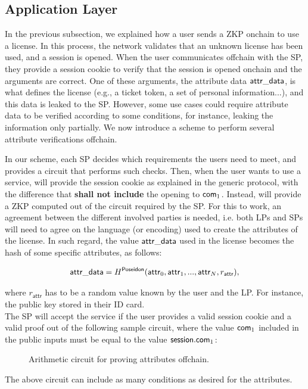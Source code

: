 \subsection{Application Layer}

In the previous subsection, we explained how a user sends a ZKP onchain to use a license. In this process, the network validates that an unknown license has been used, and a session is opened. When the user communicates offchain with the SP, they provide a session cookie to verify that the session is opened onchain and the arguments are correct. One of these arguments, the attribute data $\mathsf{attr\_data}$, is what defines the license (e.g., a ticket token, a set of personal information...), and this data is leaked to the SP. However, some use cases could require attribute data to be verified according to some conditions, for instance, leaking the information only partially. We now introduce a scheme to perform several attribute verifications offchain.

In our scheme, each SP decides which requirements the users need to meet, and provides a circuit that performs such checks. Then, when the user wants to use a service, will provide the session cookie as explained in the generic protocol, with the difference that \textbf{shall not include} the opening to $\mathsf{com}_1$. Instead, will provide a ZKP computed out of the circuit required by the SP. For this to work, an agreement between the different involved parties is needed, i.e. both LPs and SPs will need to agree on the language (or encoding) used to create the attributes of the license. In such regard, the value $\mathsf{attr\_data}$ used in the license becomes the hash of some specific attributes, as follows:

$$\mathsf{attr\_data} = H^\mathsf{Poseidon}(\mathsf{attr}_0, \mathsf{attr}_1, ..., \mathsf{attr}_N, r_\mathsf{attr}),$$

where $r_\mathsf{attr}$ has to be a random value known by the user and the LP. For instance, the public key stored in their ID card.\\

The SP will accept the service if the user provides a valid session cookie and a valid proof out of the following sample circuit, where the value $\mathsf{com}_1$ included in the public inputs must be equal to the value $\mathsf{session}.\mathsf{com}_1$:

\begin{figure}[h]
	\centering
	\setlength{\fboxsep}{5pt}%
	\setlength{\fboxrule}{0.3pt}%
	\caption{Arithmetic circuit for proving attributes offchain.}
	\label{fig:circuit_prove_offchain}
\end{figure}

The above circuit can include as many conditions as desired for the attributes.